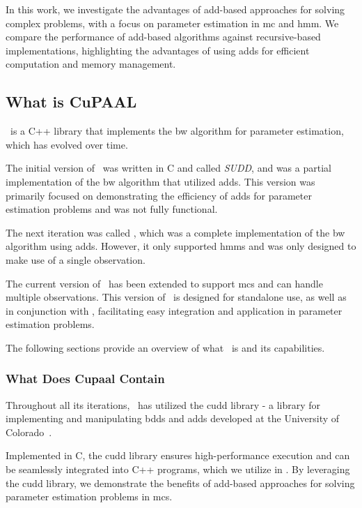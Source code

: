 In this work, we investigate the advantages of \gls{add}-based approaches for solving complex problems, with a focus on parameter estimation in \gls{mc} and \gls{hmm}. We compare the performance of \gls{add}-based algorithms against recursive-based implementations, highlighting the advantages of using \glspl{add} for efficient computation and memory management.

\subsection{What is CuPAAL}\label{subsec:what_is_cupaal}
\Cupaal\ is a C++ library that implements the \gls{bw} algorithm for parameter estimation, which has evolved over time.

The initial version of \Cupaal\ was written in C and called \textit{SUDD}, and was a partial implementation of the \gls{bw} algorithm that utilized \glspl{add}. This version was primarily focused on demonstrating the efficiency of \glspl{add} for parameter estimation problems and was not fully functional.

The next iteration was called \Cupaal, which was a complete implementation of the \gls{bw} algorithm using \glspl{add}. However, it only supported \glspl{hmm} and was only designed to make use of a single observation.

The current version of \Cupaal\ has been extended to support \glspl{mc} and can handle multiple observations. This version of \Cupaal\ is designed for standalone use, as well as in conjunction with \Jajapy, facilitating easy integration and application in parameter estimation problems.

The following sections provide an overview of what \Cupaal\ is and its capabilities.

\subsubsection{What Does Cupaal Contain}\label{subsec:what_does_cupaal_contain}
Throughout all its iterations, \Cupaal\ has utilized the \gls{cudd} library - a library for implementing and manipulating \glspl{bdd} and \glspl{add} developed at the University of Colorado~\cite{somenzi1997cudd}.

Implemented in C, the \gls{cudd} library ensures high-performance execution and can be seamlessly integrated into C++ programs, which we utilize in \Cupaal.
By leveraging the \gls{cudd} library, we demonstrate the benefits of \gls{add}-based approaches for solving parameter estimation problems in \glspl{mc}.

